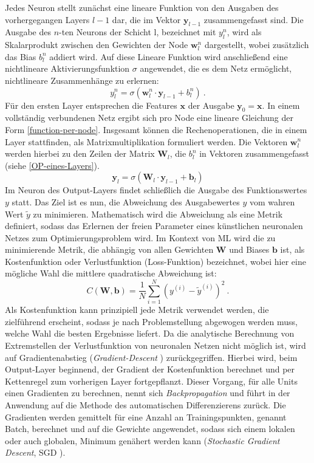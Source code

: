 Jedes Neuron stellt zunächst eine lineare Funktion von den Ausgaben des vorhergegangen Layers $l-1$ dar, die im Vektor $\mathbf{y}_{l-1}$ zusammengefasst sind. Die Ausgabe des $n$-ten Neurons der Schicht l, bezeichnet mit $y_l^n$, wird als Skalarprodukt zwischen den Gewichten der Node $\mathbf{w}_{l}^n$ dargestellt, wobei zusätzlich das Bias $b_l^n$ addiert wird. Auf diese Lineare Funktion wird anschließend eine nichtlineare Aktivierungsfunktion $\sigma$ angewendet, die es dem Netz ermöglicht, nichtlineare Zusammenhänge zu erlernen:
\begin{equation}
y_l^n = \sigma\left(\mathbf{w}_{l}^n \cdot \mathbf{y}_{l-1} + b_{l}^n\right)~.
\label{function-per-node}
\end{equation}
Für den ersten Layer entsprechen die Features $\mathbf{x}$ der Ausgabe $\mathbf{y}_0=\mathbf{x}$. In einem vollständig verbundenen Netz ergibt sich pro Node eine lineare Gleichung der Form \textsf{\autoref{function-per-node}}. Insgesamt können die Rechenoperationen, die in einem Layer stattfinden, als Matrixmultiplikation formuliert werden. Die Vektoren $\mathbf{w}_{l}^n$ werden hierbei zu den Zeilen der Matrix $\mathbf{W}_l$, die  $b_{l}^n$ in Vektoren zusammengefasst (siehe \textsf{\autoref{OP-eines-Layers}}).
\begin{equation}
\label{OP-eines-Layers}
\mathbf{y}_l = \sigma\left(\mathbf{W}_l\cdot \mathbf{y}_{l-1} + \mathbf{b}_l\right)
\end{equation}
Im Neuron des Output-Layers findet schließlich die Ausgabe des Funktionswertes $y$ statt. Das Ziel ist es nun, die Abweichung des Ausgabewertes $y$ vom wahren Wert $\tilde{y}$ zu minimieren. Mathematisch wird die Abweichung als eine Metrik definiert, sodass das Erlernen der freien Parameter eines künstlichen neuronalen Netzes zum Optimierungsproblem wird. Im Kontext von ML wird die zu minimierende Metrik, die abhängig von allen Gewichten $\mathbf{W}$ und Biases $\mathbf{b}$ ist, als Kostenfunktion oder Verlustfunktion (Loss-Funktion) bezeichnet, wobei hier eine mögliche Wahl die mittlere quadratische Abweichung ist:
\begin{equation}
C\left(\mathbf{W}, \mathbf{b}\right) = \frac{1}{N}\sum_{i=1}^{N}\left(y^{(i)} - \tilde{y}^{(i)}\right)^2~.
\end{equation}
Als Kostenfunktion kann prinzipiell jede Metrik verwendet werden, die zielführend erscheint, sodass je nach Problemstellung abgewogen werden muss, welche Wahl die besten Ergebnisse liefert. Da die analytische Berechnung von Extremstellen der Verlustfunktion von neuronalen Netzen nicht möglich ist, wird auf Gradientenabstieg (\textit{Gradient-Descent} \cite{gradient-descent}) zurückgegriffen. Hierbei wird, beim Output-Layer beginnend, der Gradient der Kostenfunktion berechnet und per Kettenregel zum vorherigen Layer fortgepflanzt. Dieser Vorgang, für alle Units einen Gradienten zu berechnen, nennt sich \textit{Backpropagation} und führt in der Anwendung auf die Methode des automatischen Differenzierens zurück. Die Gradienten werden gemittelt für eine Anzahl an Trainingspunkten, genannt Batch, berechnet und auf die Gewichte angewendet, sodass sich einem lokalen oder auch globalen, Minimum genähert werden kann (\textit{Stochastic Gradient Descent}, SGD \cite{sgd}).
